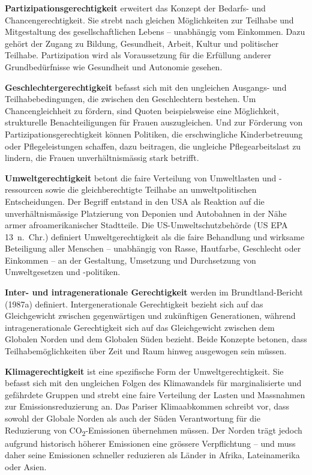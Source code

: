 \documentclass[
  nswissgerman,
  a4paper,
  openany]{book}
\begin{document}
\begin{tcolorbox}
\textbf{Partizipationsgerechtigkeit} erweitert das Konzept der Bedarfs-
und Chancengerechtigkeit. Sie strebt nach gleichen Möglichkeiten zur
Teilhabe und Mitgestaltung des gesellschaftlichen Lebens -- unabhängig
vom Einkommen. Dazu gehört der Zugang zu Bildung, Gesundheit, Arbeit,
Kultur und politischer Teilhabe. Partizipation wird als Voraussetzung
für die Erfüllung anderer Grundbedürfnisse wie Gesundheit und Autonomie
gesehen.

\textbf{Geschlechtergerechtigkeit} befasst sich mit den ungleichen
Ausgangs- und Teilhabebedingungen, die zwischen den Geschlechtern
bestehen. Um Chancengleichheit zu fördern, sind Quoten beispielsweise
eine Möglichkeit, strukturelle Benachteiligungen für Frauen
auszugleichen. Und zur Förderung von Partizipationsgerechtigkeit können
Politiken, die erschwingliche Kinderbetreuung oder Pflegeleistungen
schaffen, dazu beitragen, die ungleiche Pflegearbeitslast zu lindern,
die Frauen unverhältnismässig stark betrifft.

\textbf{Umweltgerechtigkeit} betont die faire Verteilung von
Umweltlasten und -ressourcen sowie die gleichberechtigte Teilhabe an
umweltpolitischen Entscheidungen. Der Begriff entstand in den USA als
Reaktion auf die unverhältnismässige Platzierung von Deponien und
Autobahnen in der Nähe armer afroamerikanischer Stadtteile. Die
US-Umweltschutzbehörde (US EPA 13~n.~Chr.) definiert Umweltgerechtigkeit
als die faire Behandlung und wirksame Beteiligung aller Menschen --
unabhängig von Rasse, Hautfarbe, Geschlecht oder Einkommen -- an der
Gestaltung, Umsetzung und Durchsetzung von Umweltgesetzen und
-politiken.

\textbf{Inter- und intragenerationale Gerechtigkeit} werden im
Brundtland-Bericht (1987a) definiert. Intergenerationale Gerechtigkeit
bezieht sich auf das Gleichgewicht zwischen gegenwärtigen und
zukünftigen Generationen, während intragenerationale Gerechtigkeit sich
auf das Gleichgewicht zwischen dem Globalen Norden und dem Globalen
Süden bezieht. Beide Konzepte betonen, dass Teilhabemöglichkeiten über
Zeit und Raum hinweg ausgewogen sein müssen.

\textbf{Klimagerechtigkeit} ist eine spezifische Form der
Umweltgerechtigkeit. Sie befasst sich mit den ungleichen Folgen des
Klimawandels für marginalisierte und gefährdete Gruppen und strebt eine
faire Verteilung der Lasten und Massnahmen zur Emissionsreduzierung an.
Das Pariser Klimaabkommen schreibt vor, dass sowohl der Globale Norden
als auch der Süden Verantwortung für die Reduzierung von
CO\textsubscript{2}-Emissionen übernehmen müssen. Der Norden trägt
jedoch aufgrund historisch höherer Emissionen eine grössere
Verpflichtung -- und muss daher seine Emissionen schneller reduzieren
als Länder in Afrika, Lateinamerika oder Asien.

\end{tcolorbox}
\end{document}
